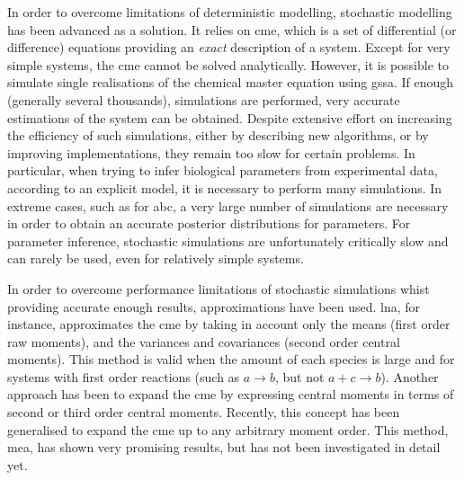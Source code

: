 In order to overcome limitations of deterministic modelling, stochastic modelling has been advanced as a solution.
It relies on \gls{cme}, which is a set of differential (or difference) equations providing an \emph{exact} description of a system\cite{kampen_stochastic_2011}.
Except for very simple systems, the \gls{cme} cannot be solved analytically.
However, it is possible to simulate single realisations of the chemical master equation using \gls{gssa}.
If enough (generally several thousands), simulations are performed, very accurate estimations of the system can be obtained.
Despite extensive effort on increasing the efficiency of such simulations, either by describing new algorithms, or by improving implementations,
they remain too slow for certain problems.
In particular, when trying to infer biological parameters from experimental data, according to an explicit model,
it is necessary to perform many simulations.
In extreme cases, such as for \gls{abc}\cite{toni_approximate_2009}, a very large number of simulations are necessary in order to obtain an 
accurate posterior distributions for parameters.
For parameter inference, stochastic simulations are unfortunately critically slow and can rarely be used, even for relatively simple systems.

In order to overcome performance limitations of stochastic simulations whist providing accurate enough results, approximations have been used.
\Gls{lna}, for instance, approximates the \gls{cme}
by taking in account only the means (first order raw moments), and the variances and covariances (second order central moments)\cite{komorowski_bayesian_2009}.
This method is valid when the amount of each species is large and for systems with first order reactions
(such as  $a \rightarrow b$, but not $a + c  \rightarrow b$).
Another approach has been to expand the \gls{cme} by expressing central moments in terms of second or third order central moments\cite{gillespie_moment-closure_2009, gomez-uribe_mass_2007}.
Recently, this concept has been generalised to expand the \gls{cme} up to any arbitrary moment order\cite{ale_general_2013}.
This method, \gls{mea}, has shown very promising results, but has not been investigated in detail yet.

